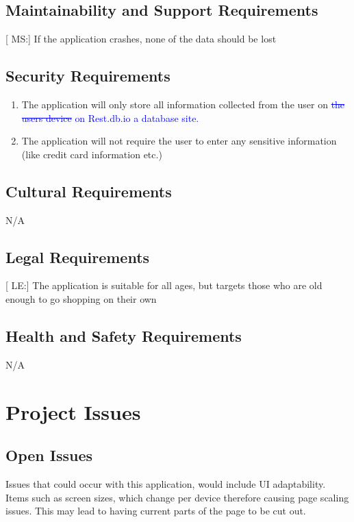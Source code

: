 \documentclass[12pt, titlepage]{article}
\newcounter{msreq}
\newcommand{\msthemsreq}{MS\themsreq}
\newcounter{secreq}
\newcommand{\sethesecreq}{SE\thesecreq}
\newcounter{legreq}
\newcommand{\legthelegreq}{LE\thelegreq}
\begin{document}
\subsection{Maintainability and Support Requirements}
 [ \msthemsreq:] If the application crashes, none of the data should be lost

\subsection{Security Requirements}
   \begin{enumerate}
     \item [\refstepcounter{secreq} \sethesecreq:] The application will only store all information collected from the user on \textcolor{blue}{\st{ the users device}} \textcolor{blue}{ on Rest.db.io a database site.} 
     \item [\refstepcounter{secreq} \sethesecreq:] The application will not require the user to enter any sensitive information (like credit card information etc.)
   \end{enumerate}
\subsection{Cultural Requirements}
N/A
\subsection{Legal Requirements}
[ \legthelegreq:]   The application is suitable for all ages, but targets those who are old enough to go shopping on their own
\subsection{Health and Safety Requirements}
N/A

\section{Project Issues}

\subsection{Open Issues}
Issues that could occur with this application, would include UI adaptability. Items such as screen sizes, which change per device therefore causing page scaling issues. This may lead to having current parts of the page to be cut out. 
\end{document}
